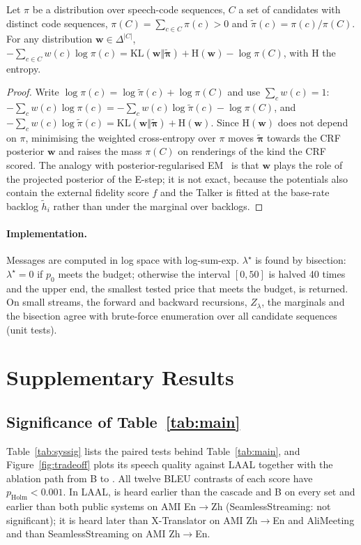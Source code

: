 \begin{proposition}
\label{prop:patrain}
Let $\pi$ be a distribution over speech-code sequences, $C$ a set of candidates with distinct code sequences,
$\pi(C)=\sum_{c\in C}\pi(c)>0$ and $\tilde{\pi}(c)=\pi(c)/\pi(C)$. For any distribution $\bm{w}\in\Delta^{|C|}$,
$-\sum_{c\in C}w(c)\log\pi(c)=\mathrm{KL}(\bm{w}\Vert\tilde{\bm{\pi}})+\mathrm{H}(\bm{w})-\log\pi(C)$, with $\mathrm{H}$ the
entropy.
\end{proposition}

\begin{proof}
Write $\log\pi(c)=\log\tilde{\pi}(c)+\log\pi(C)$ and use $\sum_cw(c)=1$:
$-\sum_cw(c)\log\pi(c)=-\sum_cw(c)\log\tilde{\pi}(c)-\log\pi(C)$, and
$-\sum_cw(c)\log\tilde{\pi}(c)=\mathrm{KL}(\bm{w}\Vert\tilde{\bm{\pi}})+\mathrm{H}(\bm{w})$.
Since $\mathrm{H}(\bm{w})$ does not depend on $\pi$, minimising the weighted cross-entropy over $\pi$ moves
$\tilde{\bm{\pi}}$ towards the CRF posterior $\bm{w}$ and raises the mass $\pi(C)$ on renderings of the kind the CRF scored.
The analogy with posterior-regularised EM~\citep{ganchev2010posterior} is that $\bm{w}$ plays the role of the projected
posterior of the E-step; it is not exact, because the potentials also contain the external fidelity score $f$ and the
Talker is fitted at the base-rate backlog $\tilde h_i$ rather than under the marginal over backlogs.
\end{proof}

\paragraph{Implementation.} Messages are computed in log space with log-sum-exp. $\lambda^\star$ is found by bisection:
$\lambda^\star=0$ if $p_0$ meets the budget; otherwise the interval $[0,50]$ is halved 40 times and the upper end, the
smallest tested price that meets the budget, is returned. On small streams, the forward and backward recursions,
$Z_\lambda$, the marginals and the bisection agree with brute-force enumeration over all candidate sequences (unit tests).

\section{Supplementary Results}
\label{app:more}
\label{app:sig10}
\label{app:postreview}

\subsection{Significance of Table~\ref{tab:main}}
Table~\ref{tab:syssig} lists the paired tests behind Table~\ref{tab:main}, and Figure~\ref{fig:tradeoff} plots its
speech quality against LAAL together with the ablation path from B to \sys{}. All twelve BLEU contrasts of each score have
$p_\text{Holm}<0.001$. In LAAL, \sys{} is heard earlier than the cascade and B on every set and earlier than both public systems on
AMI En$\rightarrow$Zh (SeamlessStreaming: not significant); it is heard later than X-Translator on AMI
Zh$\rightarrow$En and AliMeeting and than SeamlessStreaming on AMI Zh$\rightarrow$En.



